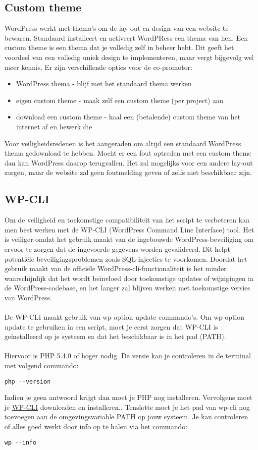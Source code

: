 \subsection{Custom theme}
WordPress werkt met thema's om de lay-out en design van een website te bewaren. Standaard installeert en activeert WordPRess een thema van hen. Een custom theme is een thema dat je volledig zelf in beheer hebt. Dit geeft het voordeel van een volledig uniek design te implementeren, maar vergt bijgevolg wel meer kennis. Er zijn verschillende opties voor de co-promotor:
\begin{itemize}
    \item WordPress thema - blijf met het standaard thema werken
    \item eigen custom theme - maak zelf een custom theme (per project) aan
    \item download een custom theme - haal een (betalende) custom theme van het internet af en bewerk die
\end{itemize}
Voor veiligheidsredenen is het aangeraden om altijd een standaard WordPress thema gedownload te hebben. Mocht er een fout optreden met een custom theme dan kan WordPress daarop terugvallen. Het zal mogelijks voor een andere lay-out zorgen, maar de website zal geen foutmelding geven of zelfs niet beschikbaar zijn. 

\subsection{WP-CLI}
Om de veiligheid en toekomstige compatibiliteit van het script te verbeteren kan men best werken met de WP-CLI (WordPress Command Line Interface) tool. Het is veiliger omdat het gebruik maakt van de ingebouwde WordPress-beveiliging om ervoor te zorgen dat de ingevoerde gegevens worden gevalideerd. Dit helpt potentiële beveiligingsproblemen zoals SQL-injecties te voorkomen. Doordat het gebruik maakt van de officiële WordPress-cli-functionaliteit is het minder waarschijnlijk dat het wordt beïnvloed door toekomstige updates of wijzigingen in de WordPress-codebase, en het langer zal blijven werken met toekomstige versies van WordPress.
\\\\
De WP-CLI maakt gebruik van wp option update commando's. Om wp option update te gebruiken in een script, moet je eerst zorgen dat WP-CLI is geïnstalleerd op je systeem en dat het beschikbaar is in het pad (PATH).
\\\\
Hiervoor is PHP 5.4.0 of hoger nodig. De versie kan je controleren in de terminal met volgend commando:
\begin{verbatim}
php --version
\end{verbatim}
Indien je geen antwoord krijgt dan moet je PHP nog installeren. Vervolgens moet je \href{https://wp-cli.org/#installing}{WP-CLI} downloaden en installeren.. Tenslotte moet je het pad van wp-cli nog toevoegen aan de omgevingsvariable PATH op jouw systeem. Je kan controleren of alles goed werkt door info op te halen via het commando:
\begin{verbatim}
wp --info
\end{verbatim}

